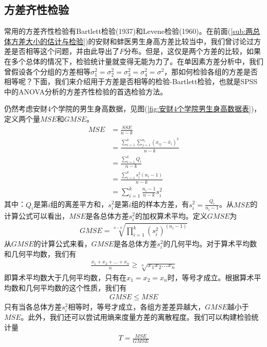     \subsection{方差齐性检验}
        \par
        常用的方差齐性检验有Bartlett检验(1937)和Levene检验(1960)。在前面(\ref{sub:两总体方差大小的估计与检验})的安财和蚌医男生身高方差比较当中，我们曾讨论过方差是否相等这个问题，并由此导出了$F$分布。但是，这仅是两个方差的比较，如果在多个总体的情况下，检验统计量就变得无能为力了。在单因素方差分析中，我们曾假设各个分组的方差相等$\sigma_1^2=\sigma_2^2=\sigma_3^2=\sigma_4^2=\sigma^2$，那如何检验各组的方差是否相等呢？下面，我们来介绍用于方差是否相等的检验-Bartlett检验，也就是SPSS中的ANOVA分析的方差齐性检验的首选检验方法。
        \par
        仍然考虑安财4个学院的男生身高数据，见图(\ref{fig:安财4个学院男生身高数据表})，定义两个量$MSE$和$GMSE$。
        \begin{align*}
        MSE &= \frac{SSE}{n-k}\\
        &= \frac{\sum_{i = 1}^k\sum_{j=1}^{n_i}(x_{ij} - \bar{x}_i)^2}{n-k}\\
        &=\frac{\sum_{i=1}^k Q_i}{n-k}\\
        &=\frac{\sum_{i=1}^ks_i^2(n_i-1)}{n-k}\\
        &=\sum_{i = 1}^k \frac{n_i-1}{n-k}s_i^2
        \end{align*}
        其中：$ Q_i$是第$i$组的离差平方和，$s_i^2$是第$i$组的样本方差，有$s_i^2 = \frac{Q_i}{n_i-1}$。从$MSE$的计算公式可以看出，$MSE$是各总体方差$s_i^2$的加权算术平均。定义$GMSE$为
        \begin{align*}
        GMSE = \sqrt[n-k]{\prod_{i = 1}^k(s_i^2)^{(n_i-1)}}
        \end{align*}
        从$GMSE$的计算公式来看，$GMSE$是各总体方差$s_i^2$的几何平均。对于算术平均数和几何平均数，我们有
        \begin{align*}
        \frac{x_1+x_2+\dots+x_n}{n} \geqslant \sqrt[n]{x_1x_2\dots x_n}
        \end{align*}
        即算术平均数大于几何平均数，只有在$x_1 = x_2 = x_n$时，等号才成立。根据算术平均数和几何平均数的这个性质，我们有
        \begin{align*}
        GMSE \leqslant MSE
        \end{align*}
        只有当各总体方差$s_i^2$相等时，等号才成立，各组方差差异越大，$GMSE$越小于$MSE$。此外，我们还可以尝试用熵来度量方差的离散程度。我们可以构建检验统计量
        \begin{align*}
        T = \frac{MSE}{GMSE}
        \end{align*}
